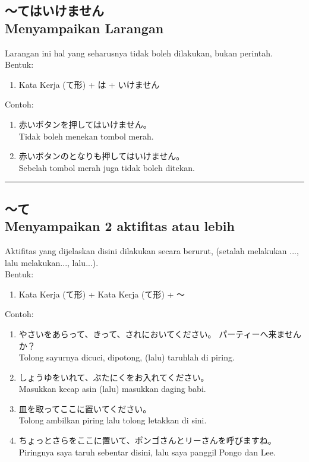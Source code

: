 \subsection*{
    ～てはいけません \\
    Menyampaikan Larangan
}
Larangan ini hal yang seharusnya tidak boleh dilakukan, bukan perintah.\\
Bentuk:
\begin{enumerate}
    \item Kata Kerja (て形) + は + いけません
\end{enumerate}
Contoh: 
\begin{enumerate}
    \item 赤いボタンを押してはいけません。
    \\ Tidak boleh menekan tombol merah.
    \item 赤いボタンのとなりも押してはいけません。
    \\ Sebelah tombol merah juga tidak boleh ditekan.
\end{enumerate}

\vspace{0.2cm}\hrule height 1pt\vspace{0.2cm}

\newpage
\subsection*{
    ～て \\
    Menyampaikan 2 aktifitas atau lebih
}
Aktifitas yang dijelaskan disini dilakukan secara berurut, 
(setalah melakukan ..., lalu melakukan..., lalu...).\\
Bentuk:
\begin{enumerate}
    \item Kata Kerja (て形) + Kata Kerja (て形) + ～
\end{enumerate}
Contoh: 
\begin{enumerate}
    \item やさいをあらって、きって、されにおいてください。
    パーティーへ来ませんか？
    \\ Tolong sayurnya dicuci, dipotong, (lalu) taruhlah di piring.
    \item しょうゆをいれて、ぶたにくをお入れてください。
    \\ Masukkan kecap asin (lalu) masukkan daging babi.
    \item 皿を取ってここに置いてください。
    \\ Tolong ambilkan piring lalu tolong letakkan di sini.
    \item ちょっとさらをここに置いて、ポンゴさんとリーさんを呼びますね。
    \\ Piringnya saya taruh sebentar disini, lalu saya panggil Pongo dan Lee.
\end{enumerate}

